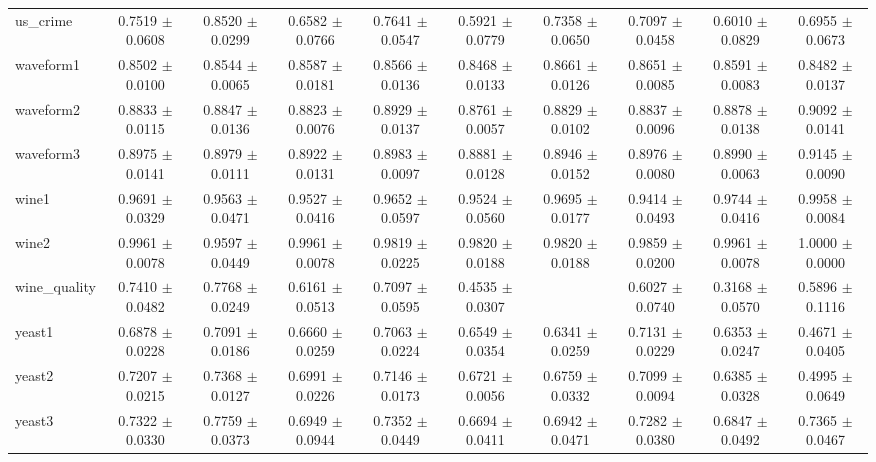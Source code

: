 \begin{table*}[htbp]
\begin{tabular}{lccccccccc}
            us\_crime & 0.7519 $\pm$ 0.0608 & 0.8520 $\pm$ 0.0299 & 0.6582 $\pm$ 0.0766 & 0.7641 $\pm$ 0.0547 & 0.5921 $\pm$ 0.0779 & 0.7358 $\pm$ 0.0650 & 0.7097 $\pm$ 0.0458 & 0.6010 $\pm$ 0.0829 & 0.6955 $\pm$ 0.0673 \\ 
            waveform1 & 0.8502 $\pm$ 0.0100 & 0.8544 $\pm$ 0.0065 & 0.8587 $\pm$ 0.0181 & 0.8566 $\pm$ 0.0136 & 0.8468 $\pm$ 0.0133 & 0.8661 $\pm$ 0.0126 & 0.8651 $\pm$ 0.0085 & 0.8591 $\pm$ 0.0083 & 0.8482 $\pm$ 0.0137 \\ 
            waveform2 & 0.8833 $\pm$ 0.0115 & 0.8847 $\pm$ 0.0136 & 0.8823 $\pm$ 0.0076 & 0.8929 $\pm$ 0.0137 & 0.8761 $\pm$ 0.0057 & 0.8829 $\pm$ 0.0102 & 0.8837 $\pm$ 0.0096 & 0.8878 $\pm$ 0.0138 & 0.9092 $\pm$ 0.0141 \\ 
            waveform3 & 0.8975 $\pm$ 0.0141 & 0.8979 $\pm$ 0.0111 & 0.8922 $\pm$ 0.0131 & 0.8983 $\pm$ 0.0097 & 0.8881 $\pm$ 0.0128 & 0.8946 $\pm$ 0.0152 & 0.8976 $\pm$ 0.0080 & 0.8990 $\pm$ 0.0063 & 0.9145 $\pm$ 0.0090 \\ 
            wine1 & 0.9691 $\pm$ 0.0329 & 0.9563 $\pm$ 0.0471 & 0.9527 $\pm$ 0.0416 & 0.9652 $\pm$ 0.0597 & 0.9524 $\pm$ 0.0560 & 0.9695 $\pm$ 0.0177 & 0.9414 $\pm$ 0.0493 & 0.9744 $\pm$ 0.0416 & 0.9958 $\pm$ 0.0084 \\ 
            wine2 & 0.9961 $\pm$ 0.0078 & 0.9597 $\pm$ 0.0449 & 0.9961 $\pm$ 0.0078 & 0.9819 $\pm$ 0.0225 & 0.9820 $\pm$ 0.0188 & 0.9820 $\pm$ 0.0188 & 0.9859 $\pm$ 0.0200 & 0.9961 $\pm$ 0.0078 & 1.0000 $\pm$ 0.0000 \\ 
            wine\_quality & 0.7410 $\pm$ 0.0482 & 0.7768 $\pm$ 0.0249 & 0.6161 $\pm$ 0.0513 & 0.7097 $\pm$ 0.0595 & 0.4535 $\pm$ 0.0307 &  & 0.6027 $\pm$ 0.0740 & 0.3168 $\pm$ 0.0570 & 0.5896 $\pm$ 0.1116 \\ 
            yeast1 & 0.6878 $\pm$ 0.0228 & 0.7091 $\pm$ 0.0186 & 0.6660 $\pm$ 0.0259 & 0.7063 $\pm$ 0.0224 & 0.6549 $\pm$ 0.0354 & 0.6341 $\pm$ 0.0259 & 0.7131 $\pm$ 0.0229 & 0.6353 $\pm$ 0.0247 & 0.4671 $\pm$ 0.0405 \\ 
            yeast2 & 0.7207 $\pm$ 0.0215 & 0.7368 $\pm$ 0.0127 & 0.6991 $\pm$ 0.0226 & 0.7146 $\pm$ 0.0173 & 0.6721 $\pm$ 0.0056 & 0.6759 $\pm$ 0.0332 & 0.7099 $\pm$ 0.0094 & 0.6385 $\pm$ 0.0328 & 0.4995 $\pm$ 0.0649 \\ 
            yeast3 & 0.7322 $\pm$ 0.0330 & 0.7759 $\pm$ 0.0373 & 0.6949 $\pm$ 0.0944 & 0.7352 $\pm$ 0.0449 & 0.6694 $\pm$ 0.0411 & 0.6942 $\pm$ 0.0471 & 0.7282 $\pm$ 0.0380 & 0.6847 $\pm$ 0.0492 & 0.7365 $\pm$ 0.0467 \\ 

\end{tabular}
\end{table*}
